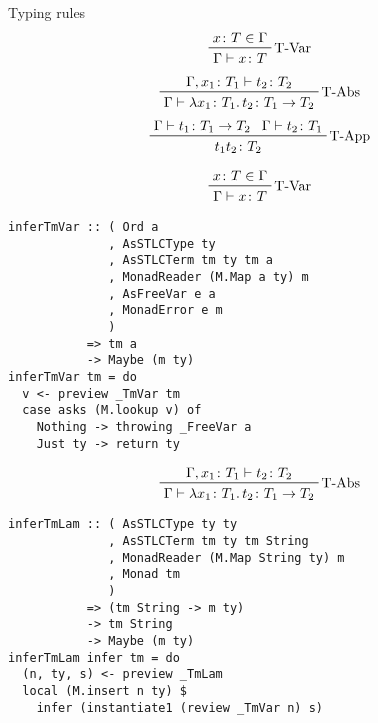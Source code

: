 \documentclass{beamer}
\begin{document}
\begin{frame}
  Typing rules
  \begin{displaymath}  
    \prftree[r]{T-Var}
    {x \colon T \in \Gamma}
    {\Gamma \vdash x \colon T}
  \end{displaymath}  
  \begin{displaymath}  
    \prftree[r]{T-Abs}
    {\Gamma, x_1 \colon T_1 \vdash t_2 \colon T_2}
    {\Gamma \vdash \lambda x_1 \colon T_1 \ldotp t_2 \colon T_1 \rightarrow T_2}
  \end{displaymath}  
  \begin{displaymath}  
    \prftree[r]{T-App}
    {\Gamma \vdash t_1 \colon T_1 \rightarrow T_2}
    {\Gamma \vdash t_2 \colon T_1}
    {t_1 t_2 \colon T_2}
  \end{displaymath}  
\end{frame}

\begin{frame}[fragile]
  \begin{displaymath}  
    \prftree[r]{T-Var}
    {x \colon T \in \Gamma}
    {\Gamma \vdash x \colon T}
  \end{displaymath}  
  \begin{verbatim}
inferTmVar :: ( Ord a
              , AsSTLCType ty
              , AsSTLCTerm tm ty tm a
              , MonadReader (M.Map a ty) m
              , AsFreeVar e a
              , MonadError e m
              )
           => tm a
           -> Maybe (m ty)
inferTmVar tm = do
  v <- preview _TmVar tm
  case asks (M.lookup v) of
    Nothing -> throwing _FreeVar a 
    Just ty -> return ty
  \end{verbatim}  
\end{frame}

\begin{frame}[fragile]
  \begin{displaymath}  
    \prftree[r]{T-Abs}
    {\Gamma, x_1 \colon T_1 \vdash t_2 \colon T_2}
    {\Gamma \vdash \lambda x_1 \colon T_1 \ldotp t_2 \colon T_1 \rightarrow T_2}
  \end{displaymath}  
  \begin{verbatim}
inferTmLam :: ( AsSTLCType ty ty
              , AsSTLCTerm tm ty tm String
              , MonadReader (M.Map String ty) m
              , Monad tm
              )
           => (tm String -> m ty)
           -> tm String
           -> Maybe (m ty)
inferTmLam infer tm = do
  (n, ty, s) <- preview _TmLam
  local (M.insert n ty) $
    infer (instantiate1 (review _TmVar n) s)
  \end{verbatim}  
\end{frame}
\end{document}
